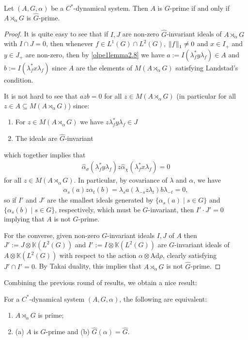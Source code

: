 \begin{lemma}
	Let $(A, G, \alpha)$ be a $C^*$-dynamical system. Then $A$ is $G$-prime if and only if $A \rtimes_\alpha G$ is $\hat G$-prime.			
	\label{olpe1.5.7}
\end{lemma}
\begin{proof}
	It is quite easy to see that if $I,J$ are non-zero $\hat G$-invariant ideals of $A \rtimes_\alpha G$ with $I \cap J = 0$, then whenever $f \in L^1(G) \cap L^2(G)$, $\left\lVert f \right\rVert_1  \neq 0$ and $x \in I_+$ and $y \in J_+$ are non-zero, then by \cref{olpe1lemma2.8} we have $a := I(\lambda_f^* y \lambda_f) \in A$ and $b := I(\lambda_f^* x \lambda_f)$ since $A$ are the elements of $M(A \rtimes_\alpha G)$ satisfying Landstad's condition.
	
	It is not hard to see that $a z b = 0$ for all $z \in M(A \rtimes_\alpha G)$ (in particular for all $z \in A \subseteq M(A \rtimes_\alpha G)$) since:
	\begin{enumerate}
		\item For $z \in M(A \rtimes_\alpha G)$ we have $z \lambda_f^* y \lambda_f \in J$
		\item The ideals are $\hat G$-invariant
	\end{enumerate}
	which together implies that 
	\begin{align*}
		\hat \alpha_{\sigma}(\lambda_f^* y \lambda_f) z \hat \alpha_{\chi}(\lambda_f^* x \lambda_f) = 0
	\end{align*}	
	for all $z \in M(A \rtimes_\alpha G)$. In particular, by covariance of $\lambda$ and $\alpha$, we have
	\begin{align*}
		\alpha_s(a) z \alpha_t(b) = \lambda_s a (\lambda_{-s} z \lambda_t) b \lambda_{-t}=0,
	\end{align*}
	so if $I'$ and $J'$ are the smallest ideals generated by $\{ \alpha_s(a) \mid s \in G\}$ and $\{ \alpha_s(b) \mid s \in G\}$, respectively, which must be $G$-invariant, then $I'\cdot J' = 0$ implying that $A$ is not $G$-prime.

	For the converse, given non-zero $G$-invariant ideals $I,J$ of $A$ then $J':=J \otimes \mathbb{K}(L^2(G))$ and $I':=I \otimes \mathbb{K}(L^2(G))$ are $G$-invariant ideals of $A \otimes \mathbb{K}(L^2(G))$ with respect to the action $\alpha \otimes \mathrm{Ad} \rho$, clearly satisfying $ J'\cap I' = 0$. By Takai duality, this implies that $A \rtimes_\alpha G$ is not $\hat G$-prime. 
\end{proof}
Combining the previous round of results, we obtain a nice result:
\begin{corollary}
	For a $C^*$-dynamical system $(A,G,\alpha)$, the following are equivalent:
	\begin{enumerate}
		\item $A \rtimes_\alpha G$ is prime;
		\item (a) $A$ is $G$-prime and (b) $\hat G(\alpha) = \hat G$.
	\end{enumerate}
	\label{olpe1.5.8}
\end{corollary}

